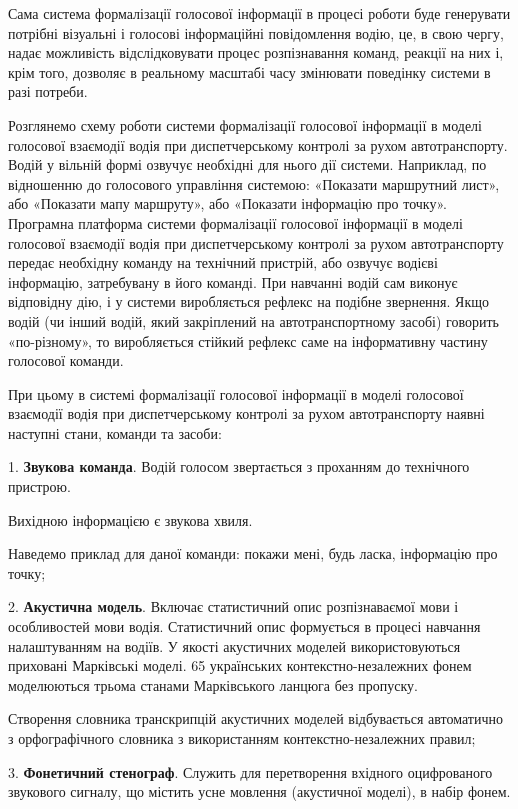 Сама система формалізації голосової інформації в процесі роботи буде генерувати потрібні візуальні і голосові інформаційні повідомлення водію, це, в свою чергу, надає можливість відслідковувати процес розпізнавання команд, реакції на них і, крім того, дозволяє в реальному масштабі часу змінювати поведінку системи в разі потреби.

Розглянемо схему роботи системи формалізації голосової інформації в моделі голосової взаємодії водія при диспетчерському контролі за рухом автотранспорту. Водій у вільній формі озвучує необхідні для нього дії системи. Наприклад, по відношенню до голосового управління системою: «Показати маршрутний лист», або «Показати мапу маршруту», або «Показати інформацію про точку». Програмна платформа системи формалізації голосової інформації в моделі голосової взаємодії водія при диспетчерському контролі за рухом автотранспорту передає необхідну команду на технічний пристрій, або озвучує водієві інформацію, затребувану в його команді. При навчанні водій сам виконує відповідну дію, і у системи виробляється рефлекс на подібне звернення. Якщо водій (чи інший водій, який закріплений на автотранспортному засобі) говорить «по-різному», то виробляється стійкий рефлекс саме на інформативну частину голосової команди.

При цьому в системі формалізації голосової інформації в моделі голосової взаємодії водія при диспетчерському контролі за рухом автотранспорту наявні наступні стани, команди та засоби:

1. \textbf{Звукова команда}. Водій голосом звертається з проханням до технічного пристрою.

Вихідною інформацією є звукова хвиля.

Наведемо приклад для даної команди: покажи мені, будь ласка, інформацію про точку;

2. \textbf{Акустична модель}. Включає статистичний опис розпізнаваємої мови і особливостей мови водія. Статистичний опис формується в процесі навчання налаштуванням на водіїв. У якості акустичних моделей використовуються приховані Марківські моделі. 65 українських контекстно-незалежних фонем моделюються трьома станами Марківського ланцюга без пропуску.

Створення словника транскрипцій акустичних моделей відбувається автоматично з орфографічного словника з використанням контекстно-незалежних правил;

3. \textbf{Фонетичний стенограф}. Служить для перетворення вхідного оцифрованого звукового сигналу, що містить усне мовлення (акустичної моделі), в набір фонем.

